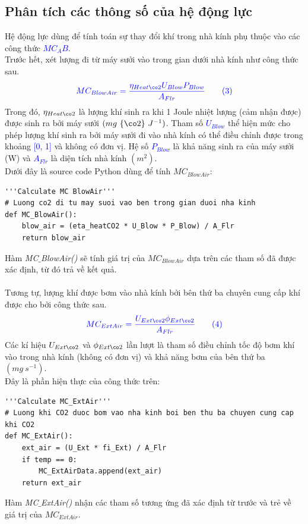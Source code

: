 \documentclass[13pt,a4paper]{article}
\begin{document}
		\subsection{Phân tích các thông số của hệ động lực}
			Hệ động lực dùng để tính toán sự thay đổi khí  trong nhà kính phụ thuộc vào các công thức \textit{\textcolor{blue}{$MC_AB$}}. \\
			Trước hết, xét lượng  đi từ máy sưởi vào trong gian dưới nhà kính như công thức sau.
			\begin{align}
				\color{blue}
					MC_{BlowAir} = \frac{\eta_{Heat\co2}U_{Blow}P_{Blow}}{A_{Flr}} 
					\tag{3} \label{ct3}
				\color{blue}
			\end{align}
			Trong đó, \textcolor{blue}{$\eta_{Heat\co2}$} là lượng khí  sinh ra khi 1 Joule nhiệt lượng (cảm nhận được) được sinh ra bởi máy sưởi $(mg\ \{\co2\}\ J^{-1})$. Tham số \textcolor{blue}{$U_{Blow}$} thể hiện mức cho phép lượng khí  sinh ra bởi máy sưởi đi vào nhà kính có thể điều chỉnh được trong khoảng \textcolor{blue}{[0, 1]} và không có đơn vị. Hệ số \textcolor{blue}{$P_{Blow}$} là khả năng sinh ra  của máy sưởi (W) và \textcolor{blue}{$A_{Flr}$} là diện tích nhà kính $(m^2)$. \\
			Dưới đây là source code Python dùng để tính $MC_{BlowAir}$: 
\begin{lstlisting}
'''Calculate MC BlowAir'''
# Luong co2 di tu may suoi vao ben trong gian duoi nha kinh
def MC_BlowAir():
	blow_air = (eta_heatCO2 * U_Blow * P_Blow) / A_Flr
	return blow_air
\end{lstlisting}
			Hàm \textit{MC$\_$BlowAir()} sẽ tính giá trị của $MC_{BlowAir}$ dựa trên các tham số đã được xác định, từ đó trả về kết quả. \\ \\
			Tương tự, lượng khí  được bơm vào nhà kính bởi bên thứ ba chuyên cung cấp khí  được cho bởi công thức sau.
			\begin{align}
				\color{blue}
					MC_{ExtAir} = \frac{U_{Ext\co2}\phi_{Ext\co2}}{A_{Flr}} 
				\color{blue}
				\tag{4} \label{ct4}
			\end{align}
			Các kí hiệu \textcolor{blue}{$U_{Ext\co2}$} và \textcolor{blue}{$\phi_{Ext\co2}$} lần lượt là tham số điều chỉnh tốc độ bơm khí  vào trong nhà kính (không có đơn vị) và khả năng bơm  của bên thứ ba $(mg\ s^{-1})$.\\
			Đây là phần hiện thực của công thức trên:
\begin{lstlisting}
'''Calculate MC_ExtAir'''
# Luong khi CO2 duoc bom vao nha kinh boi ben thu ba chuyen cung cap khi CO2
def MC_ExtAir():
	ext_air = (U_Ext * fi_Ext) / A_Flr
	if temp == 0: 
		MC_ExtAirData.append(ext_air)
	return ext_air
\end{lstlisting}
			Hàm \textit{MC$\_$ExtAir()} nhận các tham số tương ứng đã xác định từ trước và trẻ về giá trị của $MC_{ExtAir}$. \\ \\
			
\end{document}
